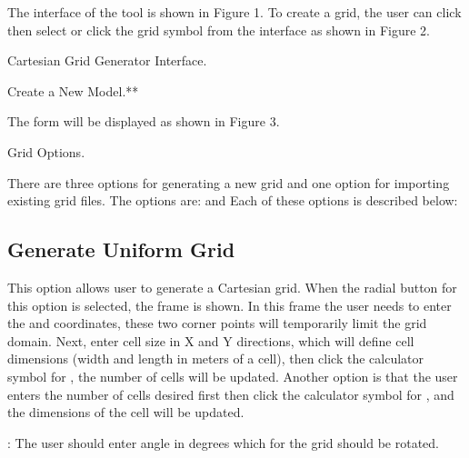 \documentclass[letterpaper,10pt,english]{sphinxmanual}
\begin{document}
The interface of the tool is shown in Figure 1. To create a grid, the
user can click  then select  or click the grid symbol
from the interface as shown in Figure 2.

 Cartesian Grid Generator Interface.


 Create a New Model.**

The  form will be displayed as shown in Figure 3.


 Grid Options.

There are three options for generating a new grid and one option for
importing existing grid files. The options are:  and  Each of these options is described below:


\subsection{Generate Uniform Grid}
\label{\detokenize{gridgen/uniformgrid:generate-uniform-grid}}\label{\detokenize{gridgen/uniformgrid:uniformgrid}}\label{\detokenize{gridgen/uniformgrid::doc}}
This option allows user to generate a Cartesian grid. When the radial
button for this option is selected, the  frame is
shown. In this frame the user needs to enter the  and
 coordinates, these two corner points will temporarily
limit the grid domain. Next, enter cell size in X and Y directions,
which will define cell dimensions (width and length in meters of a
cell), then click the calculator symbol for , the
number of cells will be updated. Another option is that the user enters
the number of cells desired first then click the calculator symbol for
, and the dimensions of the cell will be updated.

: The user should enter angle in degrees which for the
grid should be rotated.
\end{document}
